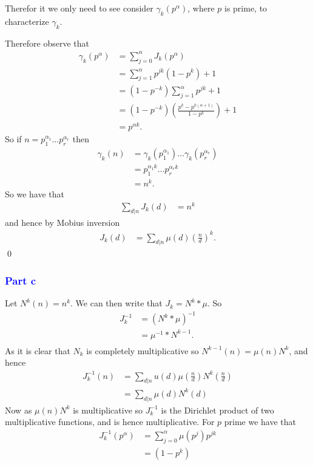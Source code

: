 \documentclass{unswmaths}
\begin{document}
Therefor it we only need to see consider $ \gamma_k(p^\alpha) $, where $ p $ is prime,
to characterize $ \gamma_k $.

Therefore observe that
\begin{align*}
    \gamma_k(p^\alpha) &= \sum_{j = 0}^\alpha J_k(p^\alpha) \\
        &= \sum_{j = 1}^\alpha p^{jk}(1-p^k) + 1 \\
        &= (1-p^{-k}) \sum_{j=1}^\alpha p^{jk} + 1 \\
        &= ( 1 - p^{-k})\left( \frac{p^k - p^{k(\alpha + 1)}}{1 - p^k} \right) + 1 \\
        &= p^{\alpha k}.
\end{align*}
So if $ n = p_1^{\alpha_1} \ldots p_r^{\alpha_r} $ then
\begin{align*}
    \gamma_k(n) &= \gamma_k(p_1^{\alpha_1}) \ldots \gamma_k(p_r^{\alpha_r}) \\
        &= p_1^{\alpha_1 k} \ldots p_r^{\alpha_r k} \\
        &= n^k.
\end{align*}
So we have that
\begin{align*}
    \sum_{d|n} J_k(d) &= n^k
\end{align*}
and hence by Mobius inversion
\begin{align*}
    J_k(d) &= \sum_{d|n} \mu(d) \left(\frac{n}{d}\right)^k.
\end{align*}
\qed
\subsubsection*{\textcolor{blue}{Part c}}

Let $ N^k(n) = n^k $. We can then write that $ J_k =  N^k * \mu $. 
So
\begin{align*}
	J_k^{-1} &= (N^k * \mu )^{-1} \\
	&= \mu^{-1} * N^{k -1}. \\
\end{align*}
As it is clear that $ N_k $ is completely multiplicative so $ N^{k -1}(n) = \mu(n)N^{k} $,
and hence 
\begin{align*}
	J_k^{-1}(n) &= \sum_{d|n} u(d) \mu\left( \frac{n}{d} \right) N^{k}\left( \frac{n}{d} \right) \\
		&= \sum_{d|n} \mu(d) N^{k}(d)
\end{align*}
Now as $ \mu(n)N^{k} $ is multiplicative so $ J_k^{-1} $ is the Dirichlet product of two multiplicative functions,
and is hence multiplicative.
For $ p $ prime we have that
\begin{align*}
	J_k^{-1}(p^\alpha) &= \sum_{j=0}^{\alpha}\mu(p^j)p^{jk} \\
		&= (1 - p^k)
\end{align*}
\end{document}

